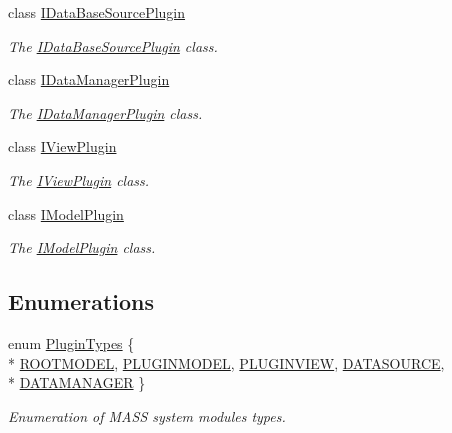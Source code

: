 \begin{DoxyCompactItemize}
class \hyperlink{class_i_data_base_source_plugin}{I\+Data\+Base\+Source\+Plugin}
\begin{DoxyCompactList}\small\item\em The \hyperlink{class_i_data_base_source_plugin}{I\+Data\+Base\+Source\+Plugin} class. \end{DoxyCompactList}\item 
class \hyperlink{class_i_data_manager_plugin}{I\+Data\+Manager\+Plugin}
\begin{DoxyCompactList}\small\item\em The \hyperlink{class_i_data_manager_plugin}{I\+Data\+Manager\+Plugin} class. \end{DoxyCompactList}\item 
class \hyperlink{class_i_view_plugin}{I\+View\+Plugin}
\begin{DoxyCompactList}\small\item\em The \hyperlink{class_i_view_plugin}{I\+View\+Plugin} class. \end{DoxyCompactList}\item 
class \hyperlink{class_i_model_plugin}{I\+Model\+Plugin}
\begin{DoxyCompactList}\small\item\em The \hyperlink{class_i_model_plugin}{I\+Model\+Plugin} class. \end{DoxyCompactList}\end{DoxyCompactItemize}
\subsection*{Enumerations}
\begin{DoxyCompactItemize}
\item 
enum \hyperlink{group___main_menu_module_ga9b3bee49ce70df90694056c2f48c2e77}{Plugin\+Types} \{ \\*
\hyperlink{group___main_menu_module_gga9b3bee49ce70df90694056c2f48c2e77ad3a5df5ff6ff933ec275f1e5bfc12dd7}{R\+O\+O\+T\+M\+O\+D\+EL}, 
\hyperlink{group___main_menu_module_gga9b3bee49ce70df90694056c2f48c2e77af2331764548e4dc1ba306a7f1e4ac028}{P\+L\+U\+G\+I\+N\+M\+O\+D\+EL}, 
\hyperlink{group___main_menu_module_gga9b3bee49ce70df90694056c2f48c2e77aec2c5b4d67821ae43397a2281c859dfd}{P\+L\+U\+G\+I\+N\+V\+I\+EW}, 
\hyperlink{group___main_menu_module_gga9b3bee49ce70df90694056c2f48c2e77af386d829790c833a6448d5d31876f605}{D\+A\+T\+A\+S\+O\+U\+R\+CE}, 
\\*
\hyperlink{group___main_menu_module_gga9b3bee49ce70df90694056c2f48c2e77a159bdb590669738efbe7ea1ac03d835e}{D\+A\+T\+A\+M\+A\+N\+A\+G\+ER}
 \}\begin{DoxyCompactList}\small\item\em Enumeration of M\+A\+SS system modules types. \end{DoxyCompactList}
\end{DoxyCompactItemize}
